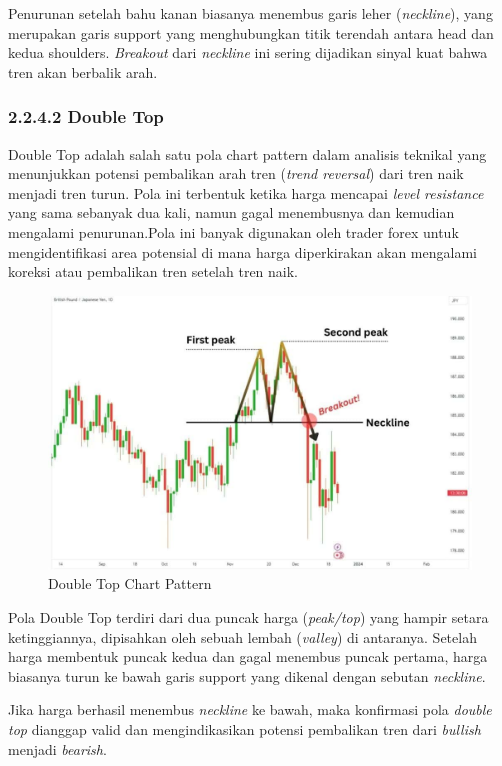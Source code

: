 Penurunan setelah bahu kanan biasanya menembus garis leher (\textit{neckline}), yang merupakan garis support yang menghubungkan titik terendah antara head dan kedua shoulders. \textit{Breakout} dari \textit{neckline} ini sering dijadikan sinyal kuat bahwa tren akan berbalik arah.

\subsubsection*{2.2.4.2 Double Top}
Double Top adalah salah satu pola chart pattern dalam analisis teknikal yang menunjukkan potensi pembalikan arah tren (\textit{trend reversal}) dari tren naik menjadi tren turun. Pola ini terbentuk ketika harga mencapai \textit{level resistance} yang sama sebanyak dua kali, namun gagal menembusnya dan kemudian mengalami penurunan.Pola ini banyak digunakan oleh trader forex untuk mengidentifikasi area potensial di mana harga diperkirakan akan mengalami koreksi atau pembalikan tren setelah tren naik.
\begin{figure} [H] \centering
    \includegraphics[scale=0.3]{gambar/doubletop.jpg} 
    \caption{Double Top Chart Pattern}
    \label{fig:label_gambar}
\end{figure}

Pola Double Top terdiri dari dua puncak harga (\textit{peak/top}) yang hampir setara ketinggiannya, dipisahkan oleh sebuah lembah (\textit{valley}) di antaranya. Setelah harga membentuk puncak kedua dan gagal menembus puncak pertama, harga biasanya turun ke bawah garis support yang dikenal dengan sebutan \textit{neckline}.

Jika harga berhasil menembus \textit{neckline} ke bawah, maka konfirmasi pola \textit{double top} dianggap valid dan mengindikasikan potensi pembalikan tren dari \textit{bullish} menjadi \textit{bearish}.


